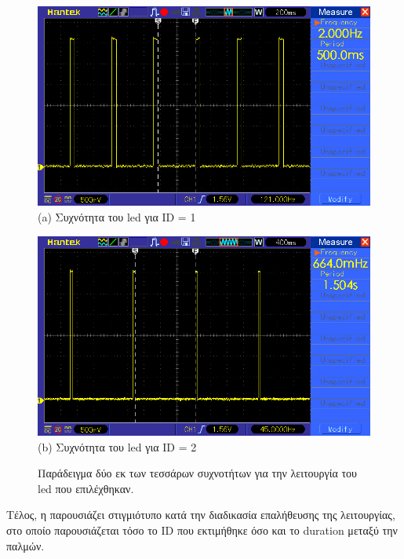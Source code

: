 \begin{figure} [H]
	\centering
    \begin{minipage}{.5\textwidth}
      \centering
      \includegraphics[width=0.9\linewidth]{../Images/Experiments-Results/node-pulses-0_5sec.png}\\
      {(a) Συχνότητα του led για ID = 1}
    \end{minipage}%
    \begin{minipage}{.5\textwidth}
      \centering
      \includegraphics[width=.9\linewidth]{../Images/Experiments-Results/node_pulses_1_5sec.png}\\
      {(b) Συχνότητα του led για ID = 2}
	  \end{minipage}
    \hfill \break
    \decoRule
    \caption[Παράδειγμα δύο εκ των τεσσάρων συχνοτήτων για την λειτουργία του led που επιλέχθηκαν.]{Παράδειγμα δύο εκ των τεσσάρων συχνοτήτων για την λειτουργία του led που επιλέχθηκαν.}%
    \label{fig:id-osci-samples}
\end{figure}

Τέλος, η  παρουσιάζει στιγμιότυπο κατά την διαδικασία επαλήθευσης της λειτουργίας, στο οποίο παρουσιάζεται τόσο το ID που εκτιμήθηκε όσο και το duration μεταξύ την παλμών.

